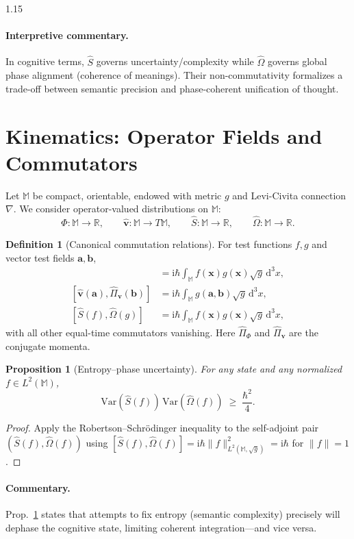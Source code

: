 \documentclass[12pt,a4paper]{article}
\numberwithin{equation}{section}
\theoremstyle{definition}
\newtheorem{definition}{Definition}[section]
\theoremstyle{plain}
\newtheorem{proposition}{Proposition}[section]
\theoremstyle{remark}
\newcommand{\M}{\mathbb{M}}
\newcommand{\hPhi}{\hat{\Phi}}
\newcommand{\hv}{\hat{\mathbf{v}}}
\newcommand{\hS}{\hat{S}}
\newcommand{\hPi}{\hat{\Pi}}
\newcommand{\hO}{\hat{\Omega}}
\newcommand{\D}{\mathrm{d}}
\newcommand{\ii}{\mathrm{i}}
\begin{document}
\begin{spacing}{1.15}
\paragraph{Interpretive commentary.}
In cognitive terms, $\hS$ governs uncertainty/complexity while $\hO$ governs global phase alignment (coherence of meanings). Their non-commutativity formalizes a trade-off between semantic precision and phase-coherent unification of thought.

\section{Kinematics: Operator Fields and Commutators}\label{sec:kinematics}
Let $\M$ be compact, orientable, endowed with metric $g$ and Levi-Civita connection $\nabla$. We consider operator-valued distributions on $\M$:
\[
\hPhi:\M\to\mathbb{R},\qquad
\hv:\M\to T\M,\qquad
\hS:\M\to\mathbb{R},\qquad
\hO:\M\to\mathbb{R}.
\]

\begin{definition}[Canonical commutation relations]\label{def:CCR}
For test functions $f,g$ and vector test fields $\mathbf{a},\mathbf{b}$,
\begin{align}
[\hPhi(f),\hPi_\Phi(g)] &= \ii\hbar \int_\M f(\mathbf{x})g(\mathbf{x})\sqrt{g}\,\D^3x,\\
[\hv(\mathbf{a}),\hPi_{\mathbf{v}}(\mathbf{b})] &= \ii\hbar \int_\M g(\mathbf{a},\mathbf{b})\sqrt{g}\,\D^3x,\\
[\hS(f),\hO(g)] &= \ii\hbar \int_\M f(\mathbf{x})g(\mathbf{x})\sqrt{g}\,\D^3x,
\end{align}
with all other equal-time commutators vanishing. Here $\hPi_\Phi$ and $\hPi_{\mathbf{v}}$ are the conjugate momenta.
\end{definition}

\begin{proposition}[Entropy--phase uncertainty]\label{prop:uncertainty}
For any state and any normalized $f\in L^2(\M)$,
\[
\mathrm{Var}(\hS(f))\,\mathrm{Var}(\hO(f)) \;\ge\; \frac{\hbar^2}{4}.
\]
\end{proposition}
\begin{proof}
Apply the Robertson--Schrödinger inequality to the self-adjoint pair $(\hS(f),\hO(f))$ using $[\hS(f),\hO(f)]=\ii\hbar\|f\|_{L^2(\M,\sqrt{g})}^2=\ii\hbar$ for $\|f\|=1$.
\end{proof}

\paragraph{Commentary.}
Prop.~\ref{prop:uncertainty} states that attempts to fix entropy (semantic complexity) precisely will dephase the cognitive state, limiting coherent integration---and vice versa.


\end{spacing}
\end{document}
